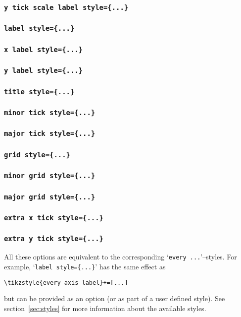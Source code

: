 \subsubsection{\texttt{y tick scale label style=\{...\}}}
\subsubsection{\texttt{label style=\{...\}}}
\subsubsection{\texttt{x label style=\{...\}}}
\subsubsection{\texttt{y label style=\{...\}}}
\subsubsection{\texttt{title style=\{...\}}}
\subsubsection{\texttt{minor tick style=\{...\}}}
\subsubsection{\texttt{major tick style=\{...\}}}
\subsubsection{\texttt{grid style=\{...\}}}
\subsubsection{\texttt{minor grid style=\{...\}}}
\subsubsection{\texttt{major grid style=\{...\}}}
\subsubsection{\texttt{extra x tick style=\{...\}}}
\subsubsection{\texttt{extra y tick style=\{...\}}}
All these options are equivalent to the corresponding `\texttt{every ...}'--styles. For example, `\texttt{label style=\{...\}}' has the same effect as 
\begin{lstlisting}
\tikzstyle{every axis label}+=[...]
\end{lstlisting}
but can be provided as an option (or as part of a user defined style).
See section~\ref{sec:styles} for more information about the available styles.

